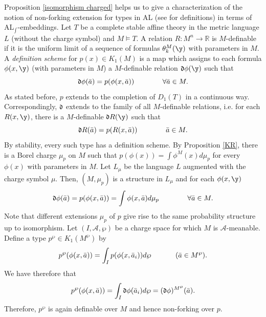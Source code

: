 \documentclass[12pt]{article}
\def\a{\bar {a}}\def\b{\bar {b}}\def\c{\bar {c}}
\def\Rn{\mathbb R}
\begin{document}
Proposition \ref{isomorphism charged} helps us to give a characterization of the notion of non-forking extension
for types in AL (see \cite{Ibarlucia2} for definitions) in terms of AL$_{\int}$-embeddings.
Let $T$ be a complete stable affine theory in the metric language $L$ (without the charge symbol) and $M\vDash T$.
A relation $R:M^n\rightarrow\Rn$ is $M$-definable if it is the uniform limit of a
sequence of formulas $\theta_k^M(\y)$ with parameters in $M$.
A \emph{definition scheme} for $p(x)\in K_1(M)$ is a map which assigns to each formula $\phi(x,\y)$ (with parameters in $M$) a
$M$-definable relation $\frak d\phi(\y)$ such that $$\frak d\phi(\a)=p(\phi(x,\a))\hspace{14mm} \forall\a\in M.$$
As stated before, $p$ extends to the completion of $D_1(T)$ in a continuous way. Correspondingly,
$\frak d$ extends to the family of all $M$-definable relations, i.e. for each $R(x,\y)$, %
there is a $M$-definable $\frak dR(\y)$ such that $$\frak dR(\a)=p(R(x,\a))\hspace{14mm}\a\in M.$$
By stability, every such type has a definition scheme.
By Proposition \ref{KR}, there is a Borel charge $\mu_p$ on $M$ such that $p(\phi(x))=\int\phi^M(x)d\mu_p$
for every $\phi(x)$ with parameters in $M$. Let $L_\mu$ be the language $L$ augmented with the charge symbol $\mu$.
Then, $(M,\mu_p)$ is a structure in $L_\mu$ and
for each $\phi(x,\y)$ $$\frak d\phi(\a)=p(\phi(x,\a))=\int\phi(x,\a)d\mu_p\hspace{14mm} \forall\a\in M.$$
Note that different extensions $\mu_p$ of $p$ give rise to the same probability structure up to isomorphism.
Let $(I,\mathcal A,\wp)$ be a charge space for which $M$ is $\mathcal A$-meanable.
Define a type $p^{\wp}\in K_1(M^\wp)$ by $$p^{\wp}(\phi(x,\a))=\int_I p(\phi(x,\a_i))d\wp\hspace{12mm} (\a\in M^\wp).$$
We have therefore that $$p^{\wp}(\phi(x,\a))=\int_I\frak d\phi(\a_i)d\wp=(\frak d\phi)^{M^\wp}(\a).$$
Therefore, $p^{\wp}$ is again definable over $M$ and hence non-forking over $p$.
\end{document}
